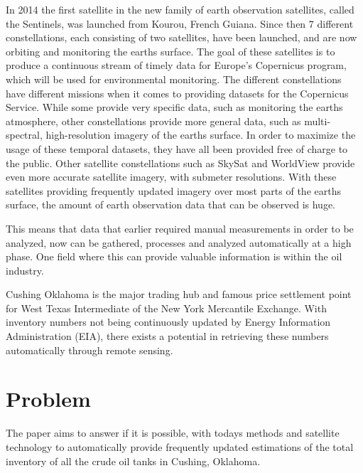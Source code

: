In 2014 the first satellite in the new family of earth observation satellites, called the Sentinels, was launched from Kourou, French Guiana. Since then 7 different constellations, each consisting of two satellites,  have been launched, and are now orbiting and monitoring the earths surface. The goal of these satellites is to produce a continuous stream of timely data for Europe's Copernicus program, which will be used for environmental monitoring. The different constellations have different missions when it comes to providing datasets for the Copernicus Service. While some provide very specific data, such as monitoring the earths atmosphere, other constellations provide more general data, such as multi-spectral, high-resolution imagery of the earths surface. In order to maximize the usage of these temporal datasets, they have all been provided free of charge to the public. Other satellite constellations such as SkySat \citep{Planet2017} and WorldView \citep{DigitalGlobe2017} provide even more accurate satellite imagery, with submeter resolutions. With these satellites providing frequently updated imagery over most parts of the earths surface, the amount of earth observation data that can be observed is huge. 

This means that data that earlier required manual measurements in order to be analyzed, now can be gathered, processes and analyzed automatically at a high phase. One field where this can provide valuable information is within the oil industry.

Cushing Oklahoma is the major trading hub and famous price settlement point for West Texas Intermediate of the New York Mercantile Exchange. With inventory numbers not being continuously updated by Energy Information Administration (EIA), there exists a potential in retrieving these numbers automatically through remote sensing.

\section{Problem}

The paper aims to answer if it is possible, with todays methods and satellite technology to automatically provide frequently updated estimations of the total inventory of all the crude oil tanks in Cushing, Oklahoma.

